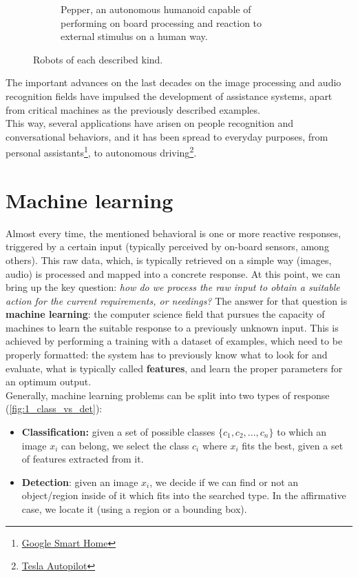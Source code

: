 \begin{figure}[h]
\begin{subfigure}[b]{0.4\textwidth}
			\caption{Pepper, an autonomous humanoid capable of performing on board processing and reaction to external stimulus on a human way.}
			\label{fig:1_pepper}
		\end{subfigure}
		\caption{Robots of each described kind.}
		\label{fig:1_robots}
		
	\end{figure}

The important advances on the last decades on the image processing and audio recognition fields have impulsed the development of assistance systems, apart from critical machines as the previously described examples. \\

This way, several applications have arisen on people recognition and conversational behaviors, and it has been spread to everyday purposes, from personal assistants\footnote{\href{https://www.standard.co.uk/tech/google-smart-home-future-stay-a3868591.html}{Google Smart Home}}, to autonomous driving\footnote{\href{https://electrek.co/2018/06/18/what-tesla-autopilot-see-understand/}{Tesla Autopilot}}.\\

\section{Machine learning}
Almost every time, the mentioned behavioral is one or more reactive responses, triggered by a certain input (typically perceived by on-board sensors, among others). This raw data, which, is typically retrieved on a simple way (images, audio) is processed and mapped into a concrete response. At this point, we can bring up the key question: \emph{how do we process the raw input to obtain a suitable action for the current requirements, or needings?} The answer for that question is \textbf{machine learning}: the computer science field that pursues the capacity of machines to learn the suitable response to a previously unknown input. This is achieved by performing a training with a dataset of examples, which need to be properly formatted: the system has to previously know what to look for and evaluate, what is typically called \textbf{features}, and learn the proper parameters for an optimum output.\\

Generally, machine learning problems can be split into two types of response (\autoref{fig:1_class_vs_det}):

\begin{itemize}
	\item \textbf{Classification:} given a set of possible classes $\{c_1, c_2, ..., c_n\}$ to which an image $x_i$ can belong, we select the class $c_i$ where $x_i$ fits the best, given a set of features extracted from it.
	\item \textbf{Detection}: given an image $x_i$, we decide if we can find or not an object/region inside of it which fits into the searched type. In the affirmative case, we locate it (using a region or a bounding box).
\end{itemize}

